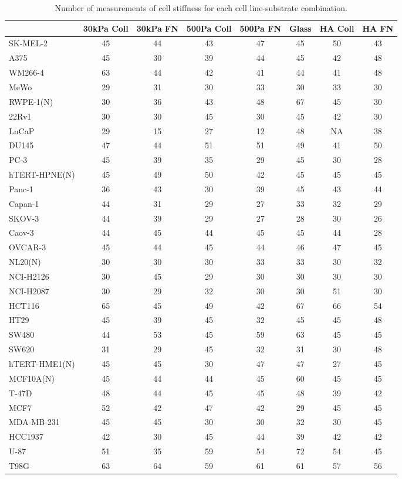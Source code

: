 \begin{table}[!h]
\centering
\caption{Number of measurements of cell stiffness for each cell line-substrate combination.
  \label{tab:count- cell_stiffness}}
\centering
\begin{tabular}[t]{lccccccc}
\toprule
  & 30kPa Coll & 30kPa FN & 500Pa Coll & 500Pa FN & Glass & HA Coll & HA FN\\
\midrule
SK-MEL-2 & 45 & 44 & 43 & 47 & 45 & 50 & 43\\
A375 & 45 & 30 & 39 & 44 & 45 & 42 & 48\\
WM266-4 & 63 & 44 & 42 & 41 & 44 & 41 & 48\\
MeWo & 29 & 31 & 30 & 33 & 30 & 33 & 30\\
RWPE-1(N) & 30 & 36 & 43 & 48 & 67 & 45 & 30\\
22Rv1 & 30 & 30 & 45 & 30 & 45 & 42 & 30\\
LnCaP & 29 & 15 & 27 & 12 & 48 & NA & 38\\
DU145 & 47 & 44 & 51 & 51 & 49 & 41 & 50\\
PC-3 & 45 & 39 & 35 & 29 & 45 & 30 & 28\\
hTERT-HPNE(N) & 45 & 49 & 50 & 42 & 45 & 45 & 45\\
Panc-1 & 36 & 43 & 30 & 39 & 45 & 43 & 44\\
Capan-1 & 44 & 31 & 29 & 27 & 33 & 32 & 29\\
SKOV-3 & 44 & 39 & 29 & 27 & 28 & 30 & 26\\
Caov-3 & 44 & 45 & 44 & 45 & 45 & 44 & 28\\
OVCAR-3 & 45 & 44 & 45 & 44 & 46 & 47 & 45\\
NL20(N) & 30 & 30 & 30 & 33 & 33 & 30 & 32\\
NCI-H2126 & 30 & 45 & 29 & 30 & 30 & 30 & 30\\
NCI-H2087 & 30 & 29 & 32 & 30 & 30 & 51 & 30\\
HCT116 & 65 & 45 & 49 & 42 & 67 & 66 & 54\\
HT29 & 45 & 39 & 45 & 32 & 45 & 45 & 48\\
SW480 & 44 & 53 & 45 & 59 & 63 & 45 & 45\\
SW620 & 31 & 29 & 45 & 32 & 31 & 30 & 48\\
hTERT-HME1(N) & 45 & 45 & 30 & 47 & 47 & 27 & 45\\
MCF10A(N) & 45 & 44 & 44 & 45 & 60 & 45 & 45\\
T-47D & 48 & 44 & 45 & 45 & 48 & 39 & 42\\
MCF7 & 52 & 42 & 47 & 42 & 29 & 45 & 45\\
MDA-MB-231 & 45 & 45 & 30 & 30 & 32 & 30 & 45\\
HCC1937 & 42 & 30 & 45 & 44 & 39 & 42 & 42\\
U-87 & 51 & 35 & 59 & 54 & 72 & 54 & 45\\
T98G & 63 & 64 & 59 & 61 & 61 & 57 & 56\\
\bottomrule
\end{tabular}
\end{table}
